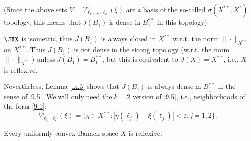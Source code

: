 (Since the above sets $V=V_{\ell_1,\ldots,\ell_k}^\varepsilon(\xi)$ are a basis of the so-called $\sigma(X^{**},X^*)$ topology, this means that $J(B_{\overline{1}})$ is dense in $B_{\overline{1}}^{**}$ in this topology)

 $\JXX$ is isometric, thus $J(B_{\overline{1}})$ is always closed in $X^{**}$ w.r.t. the norm $\|\cdot\|_{X^{**}}$ on $X^{**}$. Thus $J(B_{\overline{1}})$ is not dense in the strong topology (w.r.t. the norm $\|\cdot\|_{X^{**}}$) unless $J(B_{\overline{1}})=B_{\overline{1}}^{**}$, but this is equivalent to $J(X)=X^{**}$, i.e., $X$ is reflexive.\vspace{1.5mm}

Nevertheless, Lemma \ref{ix.3} shows that $J(B_{\overline{1}})$ is always dense in $B_{\overline{1}}^{**}$ in the sense of \eqref{9.5}. We will only need the $k=2$ version of \eqref{9.5}, i.e., neighborhoods of the form \eqref{9.1}:
\[V_{\ell_1,\ell_2}^\varepsilon(\xi)=\{\eta\in X^{**}\colon|\eta(\ell_j)-\xi(\ell_j)|<\varepsilon,j=1,2\}.\]

\begin{thm}\label{ix.4}
    Every uniformly convex Banach space $X$ is reflexive.
\end{thm}